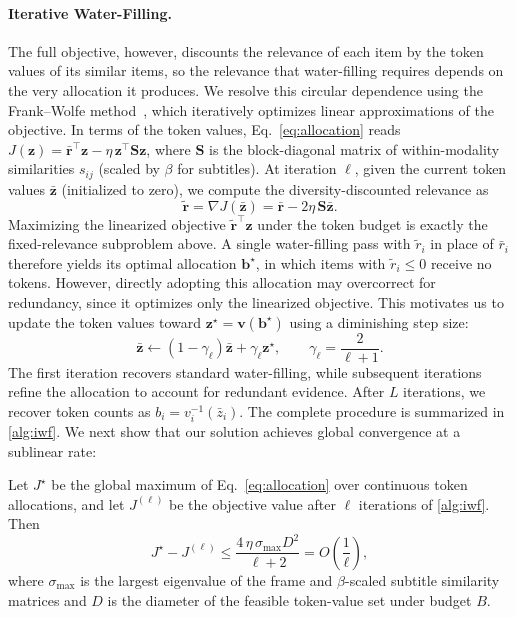 \paragraph{Iterative Water-Filling.}
The full objective, however, discounts the relevance of each item by the token values of its similar items, so the relevance that water-filling requires depends on the very allocation it produces. We resolve this circular dependence using the Frank--Wolfe method~\cite{frank1956,jaggi2013}, which iteratively optimizes linear approximations of the objective. In terms of the token values, Eq.~\eqref{eq:allocation} reads $J(\mathbf z)=\bar{\mathbf r}^{\top}\mathbf z-\eta\,\mathbf z^{\top}\mathbf S\mathbf z$, where $\mathbf S$ is the block-diagonal matrix of within-modality similarities $s_{ij}$ (scaled by $\beta$ for subtitles). At iteration $\ell$, given the current token values $\bar{\mathbf z}$ (initialized to zero), we compute the diversity-discounted relevance as
\begin{equation}
\widetilde{\mathbf r}
=\nabla J(\bar{\mathbf z})
=\bar{\mathbf r}-2\eta\,\mathbf S\bar{\mathbf z}.
\label{eq:weights}
\end{equation}
Maximizing the linearized objective $\widetilde{\mathbf r}^{\top}\mathbf z$ under the token budget is exactly the fixed-relevance subproblem above. A single water-filling pass with $\widetilde r_i$ in place of $\bar r_i$ therefore yields its optimal allocation $\mathbf b^\star$, in which items with $\widetilde r_i\leq 0$ receive no tokens. However, directly adopting this allocation may overcorrect for redundancy, since it optimizes only the linearized objective. This motivates us to update the token values toward $\mathbf z^\star=\mathbf v(\mathbf b^\star)$ using a diminishing step size:
\begin{equation}
\bar{\mathbf z}\leftarrow
(1-\gamma_\ell)\bar{\mathbf z}
+\gamma_\ell\mathbf z^\star,
\qquad
\gamma_\ell=\frac{2}{\ell+1}.
\label{eq:average}
\end{equation}
The first iteration recovers standard water-filling, while subsequent iterations refine the allocation to account for redundant evidence. After $L$ iterations, we recover token counts as $b_i=v_i^{-1}(\bar z_i)$. The complete procedure is summarized in \cref{alg:iwf}. We next show that our solution achieves global convergence at a sublinear rate:

\begin{proposition}
\label{prop:convergence}
Let $J^\star$ be the global maximum of Eq.~\eqref{eq:allocation} over continuous token allocations, and let $J^{(\ell)}$ be the objective value after $\ell$ iterations of \cref{alg:iwf}. Then
\begin{equation}
  J^\star - J^{(\ell)} \le \frac{4\,\eta\,\sigma_{\max}D^2}{\ell + 2} = O\!\left(\frac{1}{\ell}\right),
\end{equation}
where $\sigma_{\max}$ is the largest eigenvalue of the frame and $\beta$-scaled subtitle similarity matrices and $D$ is the diameter of the feasible token-value set under budget $B$.
\end{proposition}


